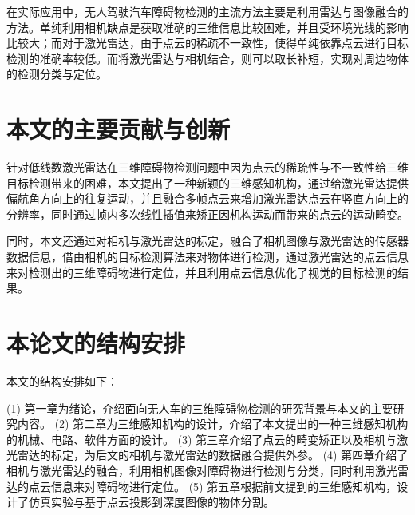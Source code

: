 在实际应用中，无人驾驶汽车障碍物检测的主流方法主要是利用雷达与图像融合的方法。单纯利用相机缺点是获取准确的三维信息比较困难，并且受环境光线的影响比较大；而对于激光雷达，由于点云的稀疏不一致性，使得单纯依靠点云进行目标检测的准确率较低。而将激光雷达与相机结合，则可以取长补短，实现对周边物体的检测分类与定位。

\section{本文的主要贡献与创新}
针对低线数激光雷达在三维障碍物检测问题中因为点云的稀疏性与不一致性给三维目标检测带来的困难，本文提出了一种新颖的三维感知机构，通过给激光雷达提供偏航角方向上的往复运动，并且融合多帧点云来增加激光雷达点云在竖直方向上的分辨率，同时通过帧内多次线性插值来矫正因机构运动而带来的点云的运动畸变。

同时，本文还通过对相机与激光雷达的标定，融合了相机图像与激光雷达的传感器数据信息，借由相机的目标检测算法来对物体进行检测，通过激光雷达的点云信息来对检测出的三维障碍物进行定位，并且利用点云信息优化了视觉的目标检测的结果。

\section{本论文的结构安排}
本文的结构安排如下：

(1) 第一章为绪论，介绍面向无人车的三维障碍物检测的研究背景与本文的主要研究内容。
(2) 第二章为三维感知机构的设计，介绍了本文提出的一种三维感知机构的机械、电路、软件方面的设计。
(3) 第三章介绍了点云的畸变矫正以及相机与激光雷达的标定，为后文的相机与激光雷达的数据融合提供外参。
(4) 第四章介绍了相机与激光雷达的融合，利用相机图像对障碍物进行检测与分类，同时利用激光雷达的点云信息来对障碍物进行定位。
(5) 第五章根据前文提到的三维感知机构，设计了仿真实验与基于点云投影到深度图像的物体分割。
